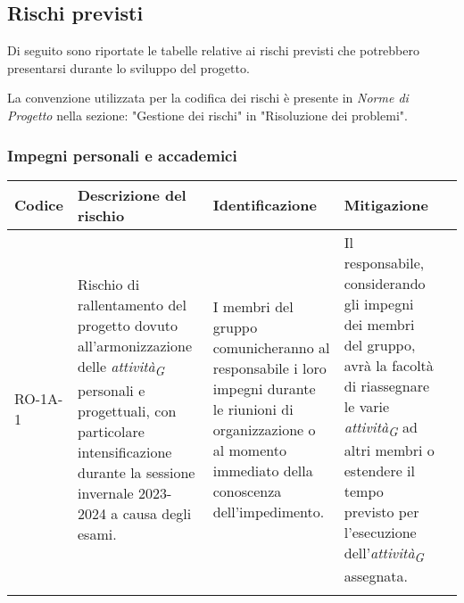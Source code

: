 \subsection{Rischi previsti}
Di seguito sono riportate le tabelle relative ai rischi previsti che potrebbero presentarsi durante lo sviluppo del progetto.  

La convenzione utilizzata per la codifica dei rischi è presente in \textit{Norme di Progetto} nella sezione: "Gestione dei rischi" in "Risoluzione dei problemi".  


\subsubsection{Impegni personali e accademici}\label{sec:ImpPersonali}
\begin{table}[ht]
    \centering
    \begin{tabularx}{\textwidth}{l>{\RaggedRight}X>{\RaggedRight}X>{\RaggedRight}X>{\RaggedRight}X}
    \toprule
    \rowcolor{gray!50}
    \textbf{Codice} & \textbf{Descrizione del rischio} & \textbf{Identificazione} & \textbf{Mitigazione} \\
    \midrule
    \addlinespace 
    RO-1A-1 & 
    Rischio di rallentamento del progetto dovuto all'armonizzazione delle \textit{attività}\textsubscript{\textit{G}} personali e progettuali, con particolare intensificazione durante la sessione invernale 2023-2024 a causa degli esami. & 
    I membri del gruppo comunicheranno al responsabile i loro impegni durante le riunioni di organizzazione o al momento immediato della conoscenza dell'impedimento. & 
    Il responsabile, considerando gli impegni dei membri del gruppo, avrà la facoltà di riassegnare le varie \textit{attività}\textsubscript{\textit{G}} ad altri membri o estendere il tempo previsto per l'esecuzione dell'\textit{attività}\textsubscript{\textit{G}} assegnata.\\  
    \bottomrule
    \addlinespace 
    \end{tabularx}
\end{table}

